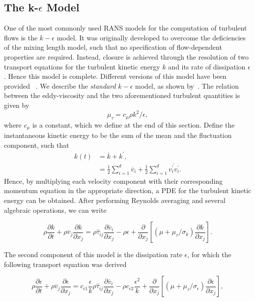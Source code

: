 \subsection{The k-$\epsilon$ Model}
One of the most commonly used RANS models for the computation of turbulent flows is the $k-\epsilon$ model. It was originally developed to overcome the deficiencies of the mixing length model, such that no specification of flow-dependent properties are required. Instead, closure is achieved through the resolution of two transport equations for the turbulent kinetic energy $k$ and its rate of dissipation $\epsilon$. Hence this model is complete. Different versions of this model have been provided ~\cite{launderApplicationEnergydissipationModel1974, jonesPredictionLaminarizationTwoequation1972}. We describe the \textit{standard} $k-\epsilon$ model, as shown by~\cite{bardinaTurbulenceModelingValidation1997}. The relation between the eddy-viscosity and the two aforementioned turbulent quantities is given by
\begin{equation}
    \mu_\tau = c_\mu \rho k^2/\epsilon,
\end{equation}
where $c_\mu$ is a constant, which we define at the end of this section. Define the instantaneous kinetic energy to be the sum of the mean and the fluctuation component, such that
\begin{align}
    k(t) &= \overline{k} + k^\prime, \nonumber \\
         &= \frac{1}{2} \sum_{i=1}^d \overline{v}_i + \frac{1}{2}\sum_{i=1}^d \overline{v_i^\prime v_i^\prime}.
\end{align}
Hence, by multiplying each velocity component with their corresponding momentum equation in the appropriate direction, a PDE for the turbulent kinetic energy can be obtained. After performing Reynolds averaging and several algebraic operations, we can write
\begin{eqBox}
\begin{equation}
    \rho\frac{\partial k}{\partial t} + 
    \rho\overline v_j \frac{\partial k}{\partial x_j} 
    = \rho \hat \tau_{ij} \frac{\partial \overline v_i}{\partial x_j}
    - \rho\epsilon + \frac{\partial}{\partial x_j}\left[(\mu + \mu_\tau/\sigma_k)\frac{\partial k}{\partial x_j}\right].
\end{equation}
\end{eqBox}
The second component of this model is the dissipation rate $\epsilon$, for which the following transport equation was derived
\begin{eqBox}
\begin{equation}
    \rho \frac{\partial \epsilon}{\partial t}
    + \rho\overline v_j \frac{\partial\epsilon}{\partial x_j}
    = c_{\epsilon 1}\frac{\epsilon}{k}  \rho \hat \tau_{ij} \frac{\partial \overline v_i}{\partial x_j}
    - \rho c_{\epsilon2} \frac{\epsilon^2}{k} 
    + \frac{\partial}{\partial x_j} \left[(\mu + \mu_\tau/\sigma_\epsilon) \frac{\partial\epsilon}{\partial x_j}\right],
\end{equation}
\end{eqBox}
